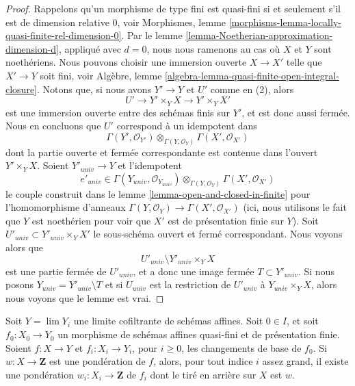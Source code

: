 \begin{proof}
Rappelons qu'un morphisme de type fini est quasi-fini si et seulement
s'il est de dimension relative $0$, voir
Morphismes, lemme \ref{morphisms-lemma-locally-quasi-finite-rel-dimension-0}.
Par le lemme \ref{lemma-Noetherian-approximation-dimension-d},
appliqué avec $d = 0$, nous nous ramenons au cas où
$X$ et $Y$ sont noethériens. Nous pouvons choisir une immersion ouverte
$X \to X'$ telle que $X' \to Y$ soit fini, voir
Algèbre, lemme \ref{algebra-lemma-quasi-finite-open-integral-closure}.
Notons que, si nous avons $Y' \to Y$ et $U'$ comme en (2), alors
$$
U' \to Y' \times_Y X \to Y' \times_Y X'
$$
est une immersion ouverte entre des schémas finis sur $Y'$, et est donc
aussi fermée. Nous en concluons que $U'$ correspond à un
idempotent dans
$$
\Gamma(Y', \mathcal{O}_{Y'})
\otimes_{\Gamma(Y, \mathcal{O}_Y)}
\Gamma(X', \mathcal{O}_{X'})
$$
dont la partie ouverte et fermée correspondante est contenue dans
l'ouvert $Y' \times_Y X$. Soient $Y'_{univ} \to Y$ et l'idempotent
$$
e'_{univ} \in
\Gamma(Y_{univ}, \mathcal{O}_{Y_{univ}})
\otimes_{\Gamma(Y, \mathcal{O}_Y)}
\Gamma(X', \mathcal{O}_{X'})
$$
le couple construit dans le lemme \ref{lemma-open-and-closed-in-finite}
pour l'homomorphisme d'anneaux $\Gamma(Y, \mathcal{O}_Y) \to \Gamma(X', \mathcal{O}_{X'})$
(ici, nous utilisons le fait que $Y$ est noethérien pour voir que $X'$ est de présentation finie
sur $Y$). Soit $U'_{univ} \subset Y'_{univ} \times_Y X'$ le sous-schéma
ouvert et fermé correspondant. Nous voyons alors que
$$
U'_{univ} \setminus Y'_{univ} \times_Y X
$$
est une partie fermée de $U'_{univ}$, et a donc une image fermée
$T \subset Y'_{univ}$. Si nous posons $Y_{univ} = Y'_{univ} \setminus T$
et si $U_{univ}$ est la restriction de $U'_{univ}$ à
$Y_{univ} \times_Y X$, alors nous voyons que le lemme est vrai.
\end{proof}

\begin{lemma}
\label{lemma-descend-weighting}
Soit $Y = \lim Y_i$ une limite cofiltrante de schémas affines. Soit $0 \in I$,
et soit $f_0 : X_0 \to Y_0$ un morphisme de schémas affines quasi-fini
et de présentation finie. Soient $f : X  \to Y$
et $f_i : X_i \to Y_i$, pour $i \geq 0$, les changements de base de $f_0$.
Si $w : X \to \mathbf{Z}$ est une pondération de $f$, alors, pour tout indice
$i$ assez grand, il existe une pondération $w_i : X_i \to \mathbf{Z}$
de $f_i$ dont le tiré en arrière sur $X$ est $w$.
\end{lemma}

